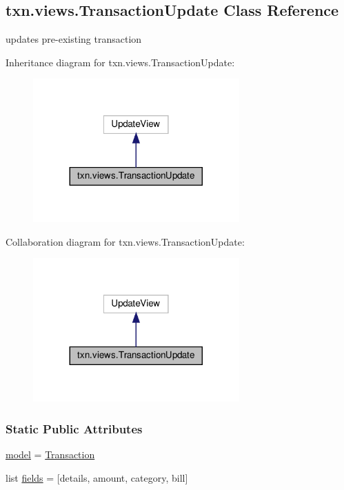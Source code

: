\hypertarget{classtxn_1_1views_1_1TransactionUpdate}{}\subsection{txn.\+views.\+Transaction\+Update Class Reference}
\label{classtxn_1_1views_1_1TransactionUpdate}


updates pre-\/existing transaction  




Inheritance diagram for txn.\+views.\+Transaction\+Update\+:\nopagebreak
\begin{figure}[H]
\begin{center}
\leavevmode
\includegraphics[width=224pt]{classtxn_1_1views_1_1TransactionUpdate__inherit__graph}
\end{center}
\end{figure}


Collaboration diagram for txn.\+views.\+Transaction\+Update\+:\nopagebreak
\begin{figure}[H]
\begin{center}
\leavevmode
\includegraphics[width=224pt]{classtxn_1_1views_1_1TransactionUpdate__coll__graph}
\end{center}
\end{figure}
\subsubsection*{Static Public Attributes}
\begin{DoxyCompactItemize}
\item 
\hyperlink{classtxn_1_1views_1_1TransactionUpdate_a72a12aa6485a035b722cacad8771ca8a}{model} = \hyperlink{classtxn_1_1models_1_1Transaction}{Transaction}
\item 
list \hyperlink{classtxn_1_1views_1_1TransactionUpdate_aede0ebc5dc84edb5de207888bfbb71fe}{fields} = \mbox{[}\textquotesingle{}details\textquotesingle{}, \textquotesingle{}amount\textquotesingle{}, \textquotesingle{}category\textquotesingle{}, \textquotesingle{}bill\textquotesingle{}\mbox{]}
\end{DoxyCompactItemize}


